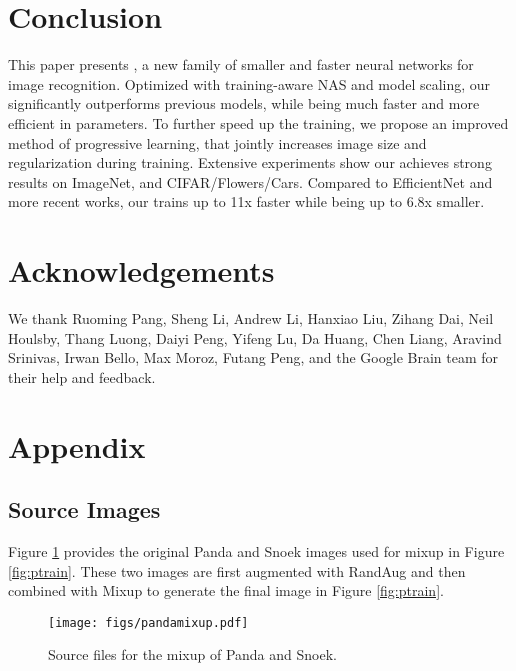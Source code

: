 \documentclass{article}
\begin{document}
\section{Conclusion}
\label{sec:conclude}
This paper presents {\xnet}, a new family of smaller and faster neural networks for image recognition. Optimized with training-aware NAS and model scaling, our {\xnet} significantly outperforms previous models, while being much faster and more efficient in parameters. To further speed up the training, we propose an improved method of progressive learning, that jointly increases image size and regularization during training. Extensive experiments show our {\xnet} achieves strong results on ImageNet, and CIFAR/Flowers/Cars. Compared to EfficientNet and more recent works, our {\xnet}  trains up to 11x faster while being up to 6.8x smaller. \section*{Acknowledgements} We thank Ruoming Pang, Sheng Li, Andrew Li, Hanxiao Liu, Zihang Dai,  Neil Houlsby, Thang Luong, Daiyi Peng, Yifeng Lu, Da Huang, Chen Liang, Aravind Srinivas, Irwan Bello,  Max Moroz, Futang Peng, and the Google Brain team for their help and feedback.




\onecolumn
\section*{Appendix}
\setcounter{section}{1}
\renewcommand{\thesubsection}{A\arabic{subsection}}
\subsection{Source Images}
\label{subsec:pandasource}
Figure \ref{fig:pmixup} provides the original Panda and Snoek images used for mixup in Figure \ref{fig:ptrain}. These two images are first augmented with RandAug and then combined with Mixup to generate the final image in Figure \ref{fig:ptrain}.

\begin{figure}[!h]
    \centering
    \texttt{[image: figs/pandamixup.pdf]}
    \vskip -0.15in
    \caption{Source files for the mixup of Panda and Snoek.}
    \label{fig:pmixup}
    \vskip -0.15in
\end{figure}
\end{document}
